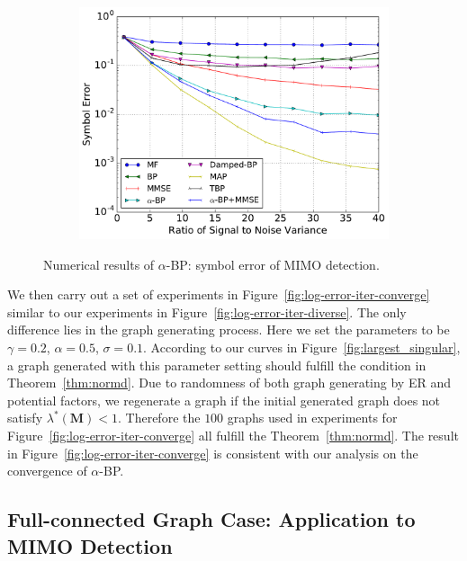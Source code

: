 \begin{figure}[!t]
\begin{subfigure}{0.5\textwidth}
    \includegraphics[width=1\columnwidth]{figures/tbp/mf_tbp_compare.pdf}
    \caption{}
    \label{fig:mimo_c}
  \end{subfigure}
  \caption{Numerical results of $\alpha$-BP: symbol error of MIMO detection.}
  \label{fig:mimo_detection}
\end{figure}

We then carry out a set of experiments in Figure~\ref{fig:log-error-iter-converge} similar to our experiments in Figure~\ref{fig:log-error-iter-diverse}. The only difference lies in the graph generating process. Here we set the parameters to be $\gamma =0.2$, $\alpha = 0.5$, $\sigma = 0.1$. According to our curves in Figure~\ref{fig:largest_singular}, a graph generated with this parameter setting should fulfill the condition in Theorem~\ref{thm:normd}. Due to randomness of both graph generating by ER and potential factors, we regenerate a graph if the initial generated graph does not satisfy $\lambda^{\ast}(\bm{M})<1$. Therefore the $100$ graphs used in experiments for Figure~\ref{fig:log-error-iter-converge} all fulfill the Theorem~\ref{thm:normd}. The result in Figure~\ref{fig:log-error-iter-converge} is consistent with our analysis on the convergence of $\alpha$-BP.



\subsection{Full-connected Graph Case: Application to MIMO Detection}

